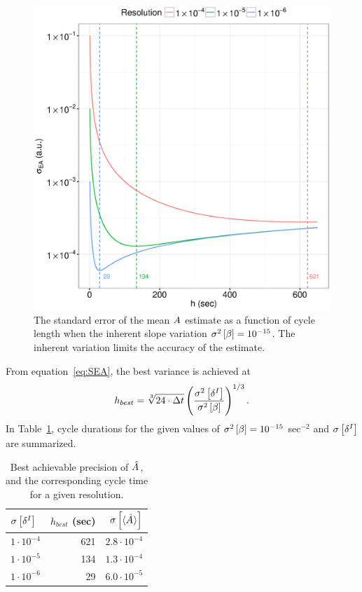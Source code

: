 \documentclass{article}
\newcommand{\Tint}{\Delta t}
\begin{document}
\begin{figure}[h]
\begin{minipage}{.5\textwidth}
		\includegraphics[scale=.5]{Polish_StateTime_Plot.eps}
		\caption{The standard error of the mean $\A$ estimate as a function of cycle length when the inherent slope variation $\v{\slp} = 10^{-15}$. The inherent variation limits the accuracy of the estimate.\label{fig:SEA_varb}}
	\end{minipage}
\end{figure}

From equation~\eqref{eq:SEA}, the best variance is achieved at
\begin{equation}
h_{best} = \sqrt[3]{24\cdot \Tint} \bkt{\frac{\v{\delta^I}}{\v{\slp}}}^{1/3}.
\end{equation}
In Table~\ref{tbl:SEA_varb}, cycle durations for the given values of $\v{\slp} = 10^{-15}$ sec$^{-2}$ and $\SE{\delta^I}$ are summarized.
\begin{table}[h]
	\centering
	\caption{Best achievable precision of $\A*$,\\ and the corresponding cycle time\\ for a given resolution.\label{tbl:SEA_varb}}
	\begin{tabular}{lrr}
		\hline\hline
		$\SE{\delta^I}$ & $h_{best}$ (sec) & $\SE{\avg{\A*}}$ \\ \hline
		$1\cdot10^{-4}$ &              621 &  $2.8\cdot10^{-4}$ \\
		$1\cdot10^{-5}$ &              134 &  $1.3\cdot10^{-4}$ \\
		$1\cdot10^{-6}$ &               29 &  $6.0\cdot10^{-5}$ \\ \hline
	\end{tabular}
\end{table}

	
\end{document}
